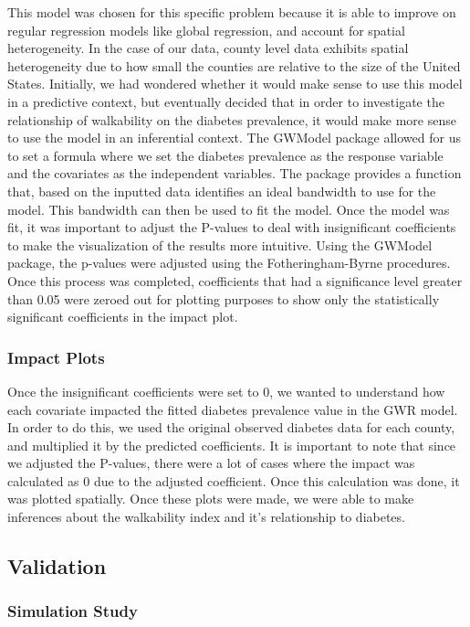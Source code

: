 \documentclass[
]{article}
\begin{document}
This model was chosen for this specific problem because it is able to
improve on regular regression models like global regression, and account
for spatial heterogeneity. In the case of our data, county level data
exhibits spatial heterogeneity due to how small the counties are
relative to the size of the United States. Initially, we had wondered
whether it would make sense to use this model in a predictive context,
but eventually decided that in order to investigate the relationship of
walkability on the diabetes prevalence, it would make more sense to use
the model in an inferential context. The GWModel package allowed for us
to set a formula where we set the diabetes prevalence as the response
variable and the covariates as the independent variables. The package
provides a function that, based on the inputted data identifies an ideal
bandwidth to use for the model. This bandwidth can then be used to fit
the model. Once the model was fit, it was important to adjust the
P-values to deal with insignificant coefficients to make the
visualization of the results more intuitive. Using the GWModel package,
the p-values were adjusted using the Fotheringham-Byrne procedures. Once
this process was completed, coefficients that had a significance level
greater than 0.05 were zeroed out for plotting purposes to show only the
statistically significant coefficients in the impact plot.

\subsubsection{Impact Plots}\label{impact-plots}

Once the insignificant coefficients were set to 0, we wanted to
understand how each covariate impacted the fitted diabetes prevalence
value in the GWR model. In order to do this, we used the original
observed diabetes data for each county, and multiplied it by the
predicted coefficients. It is important to note that since we adjusted
the P-values, there were a lot of cases where the impact was calculated
as 0 due to the adjusted coefficient. Once this calculation was done, it
was plotted spatially. Once these plots were made, we were able to make
inferences about the walkability index and it's relationship to
diabetes.

\subsection{Validation}\label{validation}

\subsubsection{Simulation Study}\label{simulation-study}
\end{document}

